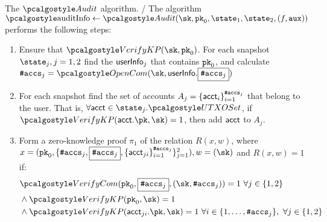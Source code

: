 \begin{boxfig}{\label{fig:audit}{The $\audit$ algorithm.}} 
/ The algorithm 
$\auditinfo \gets \audit(\sk, \inpk, \snap_{1}, \snap_{2}, (f, \aux))$ 
performs the following steps: 
\begin{enumerate}

    \item Ensure that $\verkp(\sk, \inpk)$. For each snapshot $\snap_j, j =1,2$ find the $\textup{\textsf{userInfo}}_j$ that contains $\textup{\texttt{pk}}_{0}$, and calculate $\numaccs_j = \opencom(\sk, \userinfo.\comm{\numaccs_j})$
    
   
    \item For each snapshot find the set of accounts $A_j= \{\textup{\textsf{acct}}_i\}_{i=1}^{\textup{\texttt{\#accs}}_j}$ that belong to the user. That is, $\forall \acct \in \snap_j.\utxoset$,  if $\verkp(\acct.\pk, \sk) = 1$, then add $\textup{\textsf{acct}}$ to $A_j$.
   
    \item Form a zero-knowledge proof  $\pi_1$ of the relation $R(x,w)$, where
    $x=(\inpk, \{ \numaccs_j, {\comm{\numaccs_{j}}}, \{ \acct_{ji} \}_{i=1}^{\numaccs_j}\}_{j=1}^{2}), w=(\sk)$ and $R(x,w) = 1$ if:
        {\begin{align*}
            & \vercom(\inpk, \comm{\numaccs_j}, (\sk, \numaccs_j)) = 1 \ \forall j \in \{1,2\} \\
            & \wedge \verkp(\inpk, \sk)=1 \\
            & \wedge \verkp(\acct_{ji}.\pk, \sk)=1 \ \forall i \in \{1,\dots, \numaccs_j\}, \ \forall j \in \{1,2\} \\
        \end{align*} }
   

\end{enumerate}
\end{boxfig}

